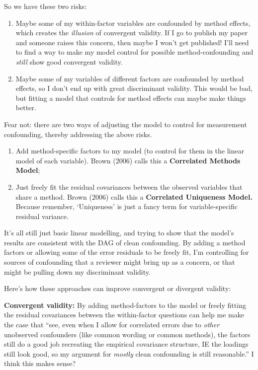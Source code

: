 \documentclass[
  letterpaper,
  DIV=11,
  numbers=noendperiod]{scrreprt}
\providecommand{\tightlist}{%
  \setlength{\itemsep}{0pt}\setlength{\parskip}{0pt}}\usepackage{longtable,booktabs,array}
\begin{document}
So we have these two risks:

\begin{enumerate}
\def\labelenumi{\arabic{enumi}.}
\tightlist
\item
  Maybe some of my within-factor variables are confounded by method
  effects, which creates the \emph{illusion} of convergent validity. If
  I go to publish my paper and someone raises this concern, then maybe I
  won't get published! I'll need to find a way to make my model control
  for possible method-confounding and \emph{still} show good convergent
  validity.
\item
  Maybe some of my variables of different factors are confounded by
  method effects, so I don't end up with great discriminant validity.
  This would be bad, but fitting a model that controls for method
  effects can maybe make things better.
\end{enumerate}

Fear not: there are two ways of adjusting the model to control for
measurement confounding, thereby addressing the above risks.

\begin{enumerate}
\def\labelenumi{\arabic{enumi}.}
\item
  Add method-specific factors to my model (to control for them in the
  linear model of each variable). Brown (2006) calls this a
  \textbf{Correlated Methods Model};
\item
  Just freely fit the residual covariances between the observed
  variables that share a method. Brown (2006) calls this a
  \textbf{Correlated Uniqueness Model.} Because remember, `Uniqueness'
  is just a fancy term for variable-specific residual variance.
\end{enumerate}

It's all still just basic linear modelling, and trying to show that the
model's results are consistent with the DAG of clean confounding. By
adding a method factors or allowing some of the error residuals to be
freely fit, I'm controlling for sources of confounding that a reviewer
might bring up as a concern, or that might be pulling down my
discriminant validity.

Here's how these approaches can improve convergent or divergent
validity:

\textbf{Convergent validity:} By adding method-factors to the model or
freely fitting the residual covariances between the within-factor
questions can help me make the case that ``see, even when I allow for
correlated errors due to \emph{other} unobserved confounders (like
common wording or common methods), the factors still do a good job
recreating the empirical covariance structure, IE the loadings still
look good, so my argument for \emph{mostly} clean confounding is still
reasonable.'' I think this makes sense?
\end{document}
